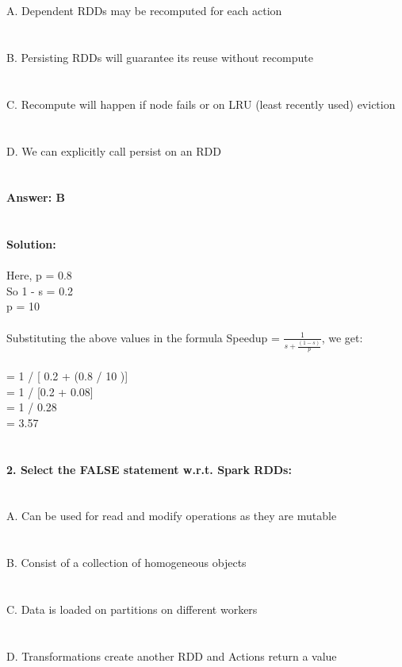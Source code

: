 \documentclass[prl,twocolumn,showpacs,preprintnumbers,superscriptaddress]{revtex4}
\theoremstyle{plain}
\theoremstyle{definition}
\begin{document}
\begin{widetext}
\\
\\
\noindent A. Dependent RDDs may be recomputed for each action\\
\\
\\
B. Persisting RDDs will guarantee its reuse without recompute\\
\\
\\
C. Recompute will happen if node fails or on LRU (least recently used) eviction\\
\\
\\
D. We can explicitly call persist on an RDD
\\
\\
\\
\textbf{Answer: B}
\\
\\
\\
\textbf{Solution:}
\\
\\
Here, p = 0.8
\\
So 1 - s = 0.2
\\
p = 10
\\
\\
Substituting the above values in the formula Speedup = $\frac{1}{s +  \frac{(1 - s)}{p}}$, we get:
\\
\\
= 1 / [ 0.2 + (0.8 / 10 )]
\\
= 1 / [0.2 + 0.08]
\\
= 1 / 0.28
\\
= 3.57
\\
\\
\\
\textbf{2. Select the FALSE statement w.r.t. Spark RDDs:}
\\
\\
\\
\noindent A. Can be used for read and modify operations as they are mutable
\\
\\
\\
B. Consist of a collection of homogeneous objects
\\
\\
\\
C. Data is loaded on partitions on different workers
\\
\\
\\
D. Transformations create another RDD and Actions return a value

\end{widetext}
\end{document}
